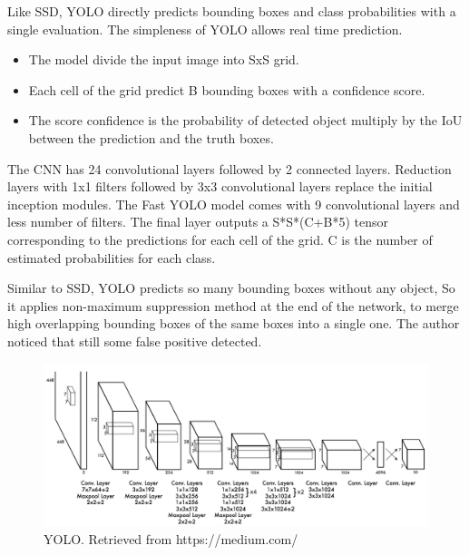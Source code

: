 \documentclass[12pt]{report}
\begin{document}
                    Like SSD, YOLO directly predicts bounding boxes and class probabilities
                    with a single evaluation. The simpleness of YOLO allows real time prediction.
                    \begin{itemize}
                        \item The model divide the input image into SxS grid.
                        \item Each cell of the grid predict B bounding boxes with a confidence score.
                        \item The score confidence is the probability of detected object multiply by the IoU between the prediction and the truth boxes.
                    \end{itemize}
                    The CNN has 24 convolutional layers followed by 2 connected layers.
                    Reduction layers with 1x1 filters followed by 3x3 convolutional layers 
                    replace the initial inception modules.
                    \bigbreak
                    The Fast YOLO model comes with 9  convolutional layers and less number of filters.
                    The final layer outputs a S*S*(C+B*5) tensor corresponding to the predictions for each cell of the grid.
                    C is the number of estimated probabilities for each class.

                    Similar to SSD, YOLO predicts so many bounding boxes without any object,
                    So it applies non-maximum suppression method at the end of the network,
                    to merge high overlapping bounding boxes of the same boxes into a single one.
                    The author noticed that still some false positive detected.\cite{Redmon2016}

                    
                    \bigbreak
                    \bigbreak
                    \bigbreak


                    \begin{figure}[h]
                    \centering
                    \includegraphics[width=1\textwidth]{./images/yolo.png}
                    \caption{YOLO. Retrieved from https://medium.com/}
                    \label{fig:frcnn}
                    \end{figure} 
\end{document}
